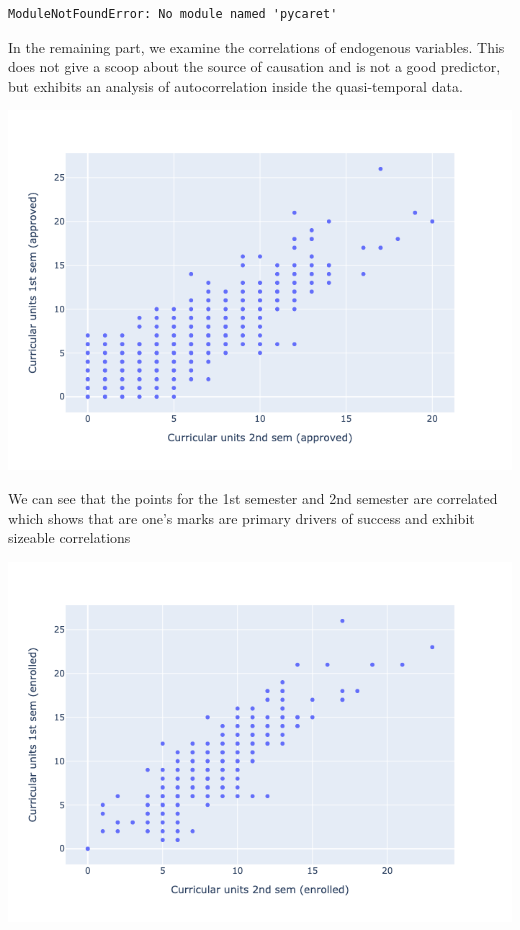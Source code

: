 \documentclass[
  letterpaper,
  DIV=11,
  numbers=noendperiod]{scrartcl}
\begin{document}
\begin{verbatim}
ModuleNotFoundError: No module named 'pycaret'
\end{verbatim}

In the remaining part, we examine the correlations of endogenous
variables. This does not give a scoop about the source of causation and
is not a good predictor, but exhibits an analysis of autocorrelation
inside the quasi-temporal data.

\includegraphics{report_AzadhdhinNedalYunisAlFraijat_files/figure-pdf/cell-47-output-1.png}

We can see that the points for the 1st semester and 2nd semester are
correlated which shows that are one's marks are primary drivers of
success and exhibit sizeable correlations

\includegraphics{report_AzadhdhinNedalYunisAlFraijat_files/figure-pdf/cell-48-output-1.png}
\end{document}
